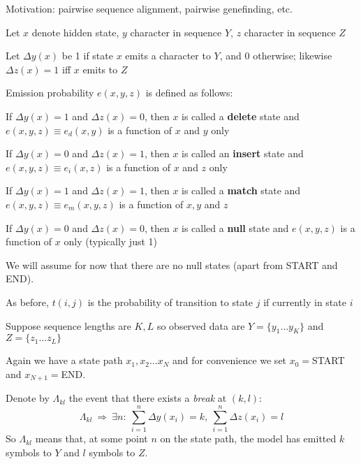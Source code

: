 \documentclass{beamer}
\begin{document}
\begin{frame}{}

\itemb
\item Motivation: pairwise sequence alignment, pairwise genefinding, etc.
\item Let $x$ denote hidden state, $y$ character in sequence $Y$, $z$ character in sequence $Z$
\item Let $\Delta y(x)$ be 1 if state $x$ emits a character to $Y$, and 0 otherwise; likewise $\Delta z(x)=1$ iff $x$ emits to $Z$
\item Emission probability $e(x,y,z)$ is defined as follows:
 \itemb
 \item If $\Delta y(x)=1$ and $\Delta z(x)=0$, then $x$ is called a {\bf delete} state and $e(x,y,z) \equiv e_d(x,y)$ is a function of $x$ and $y$ only
 \item If $\Delta y(x)=0$ and $\Delta z(x)=1$, then $x$ is called an {\bf insert} state and $e(x,y,z) \equiv e_i(x,z)$ is a function of $x$ and $z$ only
 \item If $\Delta y(x)=1$ and $\Delta z(x)=1$, then $x$ is called a {\bf match} state and $e(x,y,z) \equiv e_m(x,y,z)$ is a function of $x,y$ and $z$
 \item If $\Delta y(x)=0$ and $\Delta z(x)=0$, then $x$ is called a {\bf null} state and $e(x,y,z)$ is a function of $x$ only (typically just 1)
 \item We will assume for now that there are no null states
 (apart from START and END).
 \iteme
\iteme

\end{frame}

\begin{frame}{}

\itemb
\item As before, $t(i,j)$ is the probability of transition to state $j$ if currently in state $i$
\item Suppose sequence lengths are $K,L$ so observed data are $Y = \{ y_1 \ldots y_K \}$ and $Z = \{ z_1 \ldots z_L \}$
\item Again we have a state path $x_1, x_2 \ldots x_N$
 and for convenience we set $x_0=$START and $x_{N+1}=$END.
 \itemb
 \item Denote by $\Lambda_{kl}$ the event that there exists a {\em break} at $(k,l)$:
\[
\Lambda_{kl}\ \Rightarrow\ \exists n:
\ \sum_{i=1}^n \Delta y(x_i)=k,
\ \sum_{i=1}^n \Delta z(x_i)=l
\]
So $\Lambda_{kl}$ means that,
at some point $n$ on the state path, the model
has emitted $k$ symbols to $Y$ and $l$ symbols to $Z$.
 \iteme
\iteme

\end{frame}
\end{document}
